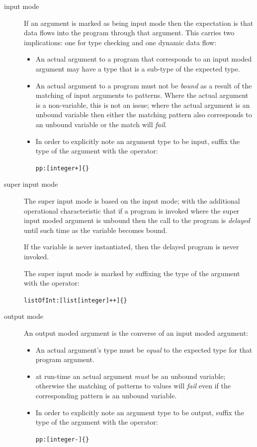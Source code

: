 \begin{description}
\item[input mode]
If an argument is marked as being input mode then the expectation is that data flows into the program through that argument. This carries two implications: one for type checking and one dynamic data flow:
\begin{itemize}
\item
An actual argument to a program that corresponds to an input moded argument may have a type that is a sub-type of the expected type.
\item
An actual argument to a program must not be \emph{bound} as a result of the matching of input arguments to patterns. Where the actual argument is a non-variable, this is not an issue; where the actual argument is an unbound variable then either the matching pattern also corresponds to an unbound variable or the match will \emph{fail}.
\item
In order to explicitly note an argument type to be input, suffix the type of the argument with the \q{+} operator:
\begin{alltt}
pp:[integer+]\{\}
\end{alltt}
\end{itemize}

\item[super input mode]
The super input mode is based on the input mode; with the additional operational characteristic that if a program is invoked where the super input moded argument is unbound then the call to the program is \emph{delayed} until such time as the variable becomes bound.

If the variable is never instantiated, then the delayed program is never invoked.

The super input mode is marked by suffixing the type of the argument with the \q{++} operator:
\begin{alltt}
listOfInt:[list[integer]++]\{\}
\end{alltt}

\item[output mode]
An output moded argument is the converse of an input moded argument:
\begin{itemize}
\item An actual argument's type must be \emph{equal} to the expected type for that program argument.
\item at run-time an actual argument \emph{must} be an unbound variable; otherwise the matching of patterns to values will \emph{fail} even if the corresponding pattern is an unbound variable.
\item
In order to explicitly note an argument type to be output, suffix the type of the argument with the \q{-} operator:
\begin{alltt}
pp:[integer-]\{\}
\end{alltt}
\end{itemize}


\end{description}
